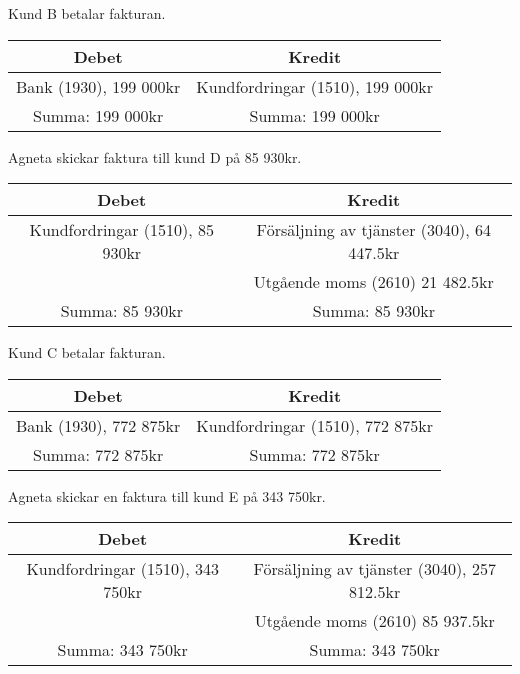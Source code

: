 \documentclass[a4paper, titlepage,12pt]{article}
\begin{document}
			Kund B betalar fakturan.
			\begin{center}
				\begin{tabular}{|c|c|}
					\hline
					\textbf{Debet} & \textbf{Kredit} \\
					\hline
					Bank (1930), 199 000kr & Kundfordringar (1510), 199 000kr \\
					\hline
					Summa: 199 000kr & Summa: 199 000kr\\
					\hline
				\end{tabular}
			\end{center}

			Agneta skickar faktura till kund D på 85 930kr.
			\begin{center}
				\begin{tabular}{|c|c|}
					\hline
					\textbf{Debet} & \textbf{Kredit} \\
					\hline
					Kundfordringar (1510), 85 930kr & Försäljning av tjänster (3040), 64 447.5kr \\
					\hline
					& Utgående moms (2610) 21 482.5kr\\
					\hline
					Summa: 85 930kr & Summa: 85 930kr\\
					\hline
				\end{tabular}
			\end{center}


			Kund C betalar fakturan.
			\begin{center}
				\begin{tabular}{|c|c|}
					\hline
					\textbf{Debet} & \textbf{Kredit} \\
					\hline
					Bank (1930), 772 875kr & Kundfordringar (1510), 772 875kr \\
					\hline
					Summa: 772 875kr & Summa: 772 875kr\\
					\hline
				\end{tabular}
			\end{center}


			Agneta skickar en faktura till kund E på 343 750kr.
			\begin{center}
				\begin{tabular}{|c|c|}
					\hline
					\textbf{Debet} & \textbf{Kredit} \\
					\hline
					Kundfordringar (1510), 343 750kr & Försäljning av tjänster (3040), 257 812.5kr \\
					\hline
					& Utgående moms (2610) 85 937.5kr \\
					\hline
					Summa: 343 750kr & Summa: 343 750kr\\
					\hline
				\end{tabular}
			\end{center}
\end{document}
